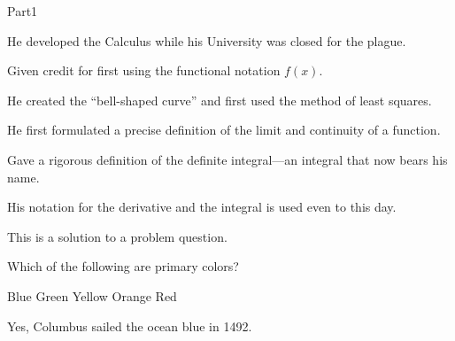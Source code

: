 \documentclass{article}
\begin{document}
\begin{exam}[Part I.]{Part1}
\begin{problem}[5]
\begin{multicols}{2}


\begin{answers}{1} %

\bChoices
     He developed the Calculus while his University was closed
          for the plague.\eAns %

     Given credit for first using the functional notation
          $f(x)$.\eAns %

     He created the ``bell-shaped curve'' and first used the
          method of least squares.\eAns  %

     He first formulated a precise definition of the limit
          and continuity of a function.\eAns  %

     Gave a rigorous definition of the definite integral---an
          integral that now bears his name.\eAns  %

     His notation for the derivative and the integral is used
         even to this day.\eAns %
\eChoices

\end{answers}

\end{multicols}

\begin{solution}
This is a solution to a problem question.
\end{solution}

\end{problem}


\begin{problem}[5]
Which of the following are primary colors?
    \begin{manswers}{6} %
        \bChoices
             Blue\eAns
             Green\eAns
             Yellow\eAns
             Orange\eAns
             Red\eAns
        \eChoices
    \end{manswers}
\begin{solution}
    Yes, Columbus sailed the ocean blue in 1492.
\end{solution}
\end{problem}


\end{exam}
\end{document}
